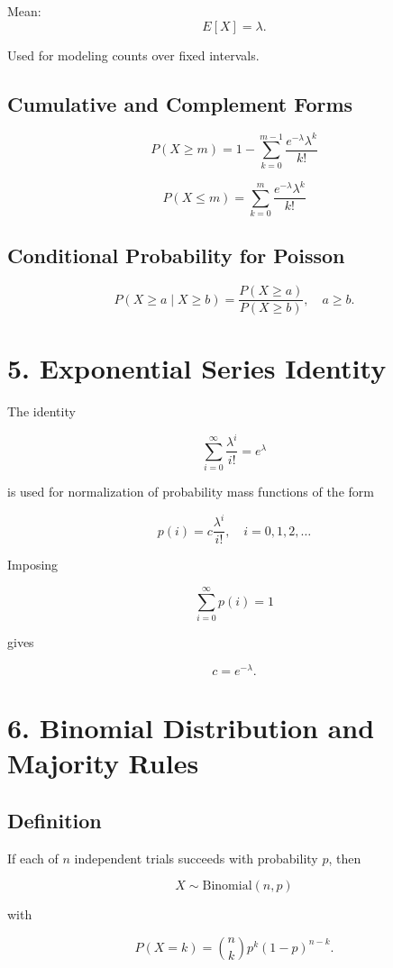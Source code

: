 \documentclass[12pt]{article}
\begin{document}
Mean: 
\[
E[X] = \lambda.
\]

Used for modeling counts over fixed intervals.

\subsection*{Cumulative and Complement Forms}

\[
P(X \ge m) = 1 - \sum_{k=0}^{m-1} \frac{e^{-\lambda} \lambda^k}{k!}
\]

\[
P(X \le m) = \sum_{k=0}^{m} \frac{e^{-\lambda} \lambda^k}{k!}
\]

\subsection*{Conditional Probability for Poisson}

\[
P(X \ge a \mid X \ge b) = \frac{P(X \ge a)}{P(X \ge b)}, \quad a \ge b.
\]

\section*{5. Exponential Series Identity}

The identity

\[
\sum_{i=0}^{\infty} \frac{\lambda^i}{i!} = e^{\lambda}
\]

is used for normalization of probability mass functions of the form

\[
p(i) = c \frac{\lambda^i}{i!}, \quad i = 0,1,2,\dots
\]

Imposing

\[
\sum_{i=0}^{\infty} p(i) = 1
\]

gives

\[
c = e^{-\lambda}.
\]

\section*{6. Binomial Distribution and Majority Rules}

\subsection*{Definition}

If each of $n$ independent trials succeeds with probability $p$, then

\[
X \sim \text{Binomial}(n,p)
\]

with

\[
P(X = k) = \binom{n}{k} p^k (1-p)^{n-k}.
\]
\end{document}
